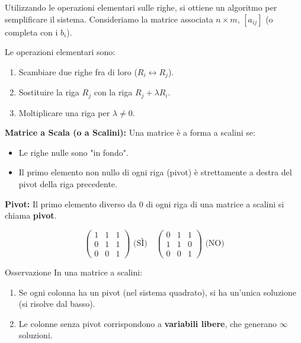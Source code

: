 Utilizzando le operazioni elementari sulle righe, si ottiene un algoritmo per semplificare il sistema.
Consideriamo la matrice associata $n \times m$, $[a_{ij}]$ (o completa con i $b_i$).

Le operazioni elementari sono:
\begin{enumerate}
    \item Scambiare due righe fra di loro ($R_i \leftrightarrow R_j$).
    \item Sostituire la riga $R_j$ con la riga $R_j + \lambda R_i$.
    \item Moltiplicare una riga per $\lambda \neq 0$.
\end{enumerate}

\begin{definitionbox}
\textbf{Matrice a Scala (o a Scalini):} Una matrice è a forma a scalini se:
\begin{itemize}
    \item Le righe nulle sono "in fondo".
    \item Il primo elemento non nullo di ogni riga (pivot) è strettamente a destra del pivot della riga precedente.
\end{itemize}
\end{definitionbox}

\begin{definitionbox}
\textbf{Pivot:} Il primo elemento diverso da 0 di ogni riga di una matrice a scalini si chiama \textbf{pivot}.
\end{definitionbox}

\begin{exercisebox}[title={Esempio: Matrici a Scalini}]
$$
\begin{pmatrix} 1 & 1 & 1 \\ 0 & 1 & 1 \\ 0 & 0 & 1 \end{pmatrix} \text{ (SÌ)} \quad
\begin{pmatrix} 0 & 1 & 1 \\ 1 & 1 & 0 \\ 0 & 0 & 1 \end{pmatrix} \text{ (NO)}
$$
\end{exercisebox}

\begin{concept}{Osservazione}
In una matrice a scalini:
\begin{enumerate}
    \item Se ogni colonna ha un pivot (nel sistema quadrato), si ha un'unica soluzione (si risolve dal basso).
    \item Le colonne senza pivot corrispondono a \textbf{variabili libere}, che generano $\infty$ soluzioni.
\end{enumerate}
\end{concept}

